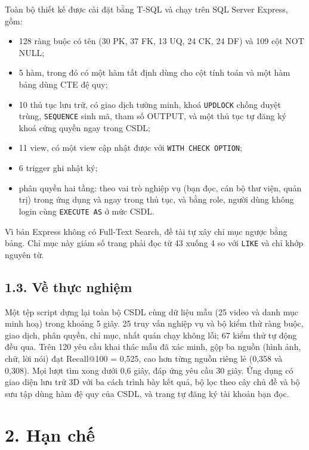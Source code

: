 Toàn bộ thiết kế được cài đặt bằng T-SQL và chạy trên SQL Server Express, gồm:
\begin{itemize}
    \item 128 ràng buộc có tên (30 PK, 37 FK, 13 UQ, 24 CK, 24 DF) và 109 cột NOT NULL;
    \item 5 hàm, trong đó có một hàm tất định dùng cho cột tính toán và một hàm bảng dùng CTE
    đệ quy;
    \item 10 thủ tục lưu trữ, có giao dịch tường minh, khoá \texttt{UPDLOCK} chống duyệt trùng,
    \texttt{SEQUENCE} sinh mã, tham số OUTPUT, và một thủ tục tự đăng ký khoá cứng quyền ngay
    trong CSDL;
    \item 11 view, có một view cập nhật được với \texttt{WITH CHECK OPTION};
    \item 6 trigger ghi nhật ký;
    \item phân quyền hai tầng: theo vai trò nghiệp vụ (bạn đọc, cán bộ thư viện, quản trị)
    trong ứng dụng và ngay trong thủ tục, và bằng role, người dùng không login cùng
    \texttt{EXECUTE AS} ở mức CSDL.
\end{itemize}
Vì bản Express không có Full-Text Search, đề tài tự xây chỉ mục ngược bằng bảng. Chỉ mục này
giảm số trang phải đọc từ 43 xuống 4 so với \texttt{LIKE} và chỉ khớp nguyên từ.

\subsection*{1.3. Về thực nghiệm}

Một tệp script dựng lại toàn bộ CSDL cùng dữ liệu mẫu (25 video và danh mục minh hoạ) trong
khoảng 5 giây. 25 truy vấn nghiệp vụ và bộ kiểm thử ràng buộc, giao dịch, phân quyền, chỉ mục,
nhất quán chạy không lỗi; 67 kiểm thử tự động đều qua. Trên 120 yêu cầu khai thác mẫu đã xác
minh, gộp ba nguồn (hình ảnh, chữ, lời nói) đạt Recall@100 = 0,525, cao hơn từng nguồn riêng
lẻ (0,358 và 0,308). Mọi lượt tìm xong dưới 0,6 giây, đáp ứng yêu cầu 30 giây. Ứng dụng
có giao diện lưu trữ 3D với ba cách trình bày kết quả, bộ lọc theo cây chủ đề và bộ sưu tập
dùng hàm đệ quy của CSDL, và trang tự đăng ký tài khoản bạn đọc.

\section*{2. Hạn chế}

